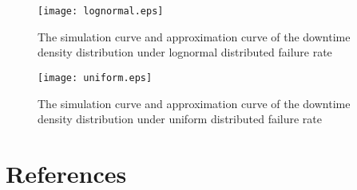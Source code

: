 \documentclass[preprint,12pt]{elsarticle}
\begin{document}
\begin{appendices}
\begin{figure}
\centering
\texttt{[image: lognormal.eps]}
 \caption{The simulation curve and approximation curve of the downtime density distribution under lognormal distributed failure rate}
 \label{fig:lognormal}
\end{figure}


\begin{figure}
\centering
\texttt{[image: uniform.eps]}
 \caption{The simulation curve and approximation curve of the downtime density distribution under uniform distributed failure rate}
  \label{fig:uniform}
\end{figure}

\end{appendices}

\newpage
\section{References}
%


\end{document}
